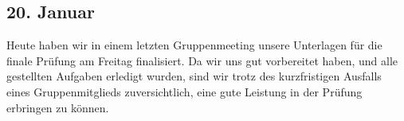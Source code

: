\subsection{20. Januar}
Heute haben wir in einem letzten Gruppenmeeting unsere Unterlagen für die finale Prüfung am Freitag finalisiert. Da wir uns gut vorbereitet haben, und alle gestellten Aufgaben erledigt wurden, sind wir trotz des kurzfristigen Ausfalls eines Gruppenmitglieds zuversichtlich, eine gute Leistung in der Prüfung erbringen zu können.